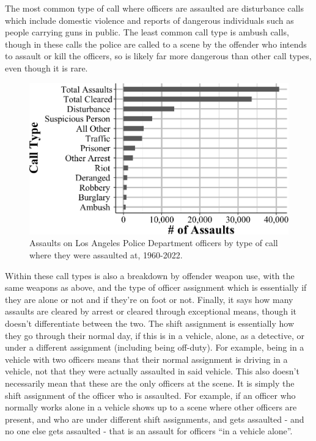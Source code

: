 \documentclass[
  12pt,
  openany]{book}
\begin{document}
The most common type of call where officers are assaulted are disturbance calls which include domestic violence and reports of dangerous individuals such as people carrying guns in public. The least common call type is ambush calls, though in these calls the police are called to a scene by the offender who intends to assault or kill the officers, so is likely far more dangerous than other call types, even though it is rare.

\begin{figure}

{\centering \includegraphics[width=0.9\linewidth]{07_leoka_files/figure-latex/leokaAssaultCallType-1} 

}

\caption{Assaults on Los Angeles Police Department officers by type of call where they were assaulted at, 1960-2022.}\label{fig:leokaAssaultCallType}
\end{figure}

Within these call types is also a breakdown by offender weapon use, with the same weapons as above, and the type of officer assignment which is essentially if they are alone or not and if they're on foot or not. Finally, it says how many assaults are cleared by arrest or cleared through exceptional means, though it doesn't differentiate between the two. The shift assignment is essentially how they go through their normal day, if this is in a vehicle, alone, as a detective, or under a different assignment (including being off-duty). For example, being in a vehicle with two officers means that their normal assignment is driving in a vehicle, not that they were actually assaulted in said vehicle. This also doesn't necessarily mean that these are the only officers at the scene. It is simply the shift assignment of the officer who is assaulted. For example, if an officer who normally works alone in a vehicle shows up to a scene where other officers are present, and who are under different shift assignments, and gets assaulted - and no one else gets assaulted - that is an assault for officers ``in a vehicle alone''.
\end{document}
